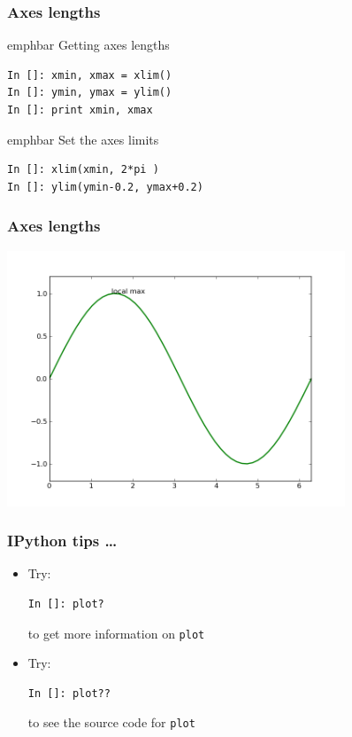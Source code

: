 \documentclass[14pt,compress]{beamer}
\newcommand{\emphbar}[1]
{\begin{beamercolorbox}[rounded=true]{emphbar} 
      {#1}
 \end{beamercolorbox}
}
\newcommand{\typ}[1]{\lstinline{#1}}
\begin{document}
\begin{frame}[fragile]
\frametitle{Axes lengths}
\emphbar{Getting axes lengths}
  \begin{lstlisting}
In []: xmin, xmax = xlim() 
In []: ymin, ymax = ylim() 
In []: print xmin, xmax 
  \end{lstlisting}
\emphbar{Set the axes limits}
  \begin{lstlisting}
In []: xlim(xmin, 2*pi )
In []: ylim(ymin-0.2, ymax+0.2)
  \end{lstlisting}
\end{frame}

\begin{frame}[fragile]
  \frametitle{Axes lengths}
  \begin{center}
    \includegraphics[height=3in, interpolate=true]{data/limits}
  \end{center}
\end{frame}

\begin{frame}[fragile]
\frametitle{IPython tips \ldots}

\begin{itemize}

    \item Try:
\begin{lstlisting}
In []: plot?
\end{lstlisting}
        to get more information on \typ{plot} 

        \vspace*{0.5in}
    \item Try: 
\begin{lstlisting}
In []: plot??
\end{lstlisting}
    to see the source code for \typ{plot}

\end{itemize}

\end{frame}
\end{document}
